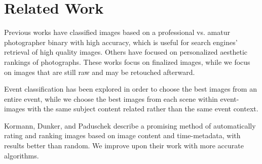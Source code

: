 \documentclass{article}
\begin{document}
\section{Related Work}

Previous works have classified images based on a professional vs. amatur photographer binary with high accuracy\cite{1640788}\cite{springerlink:10.1007/11744078_23}\cite{springerlink:10.1007/978-3-540-88690-7_29}, which is useful for search engines' retrieval of high quality images. Others have focused on personalized aesthetic rankings of photographs\cite {Sun:2009:PAB:1631272.1631351}\cite {Yeh:2010:PPR:1873951.1873963}. These works focus on finalized images, while we focus on images that are still raw and may be retouched afterward.

Event classification has been explored in order to choose the best images from an entire event\cite{1223566}\cite{4444209}, while we choose the best images from each scene within event- images with the same subject content related rather than the same event context.

Kormann, Dunker, and Paduschek\cite{springerlink:10.1007/978-3-642-10543-2_23} describe a promising method of automatically rating and ranking images based on image content and time-metadata, with results better than random. We improve upon their work with more accurate algorithms.




\end{document}
